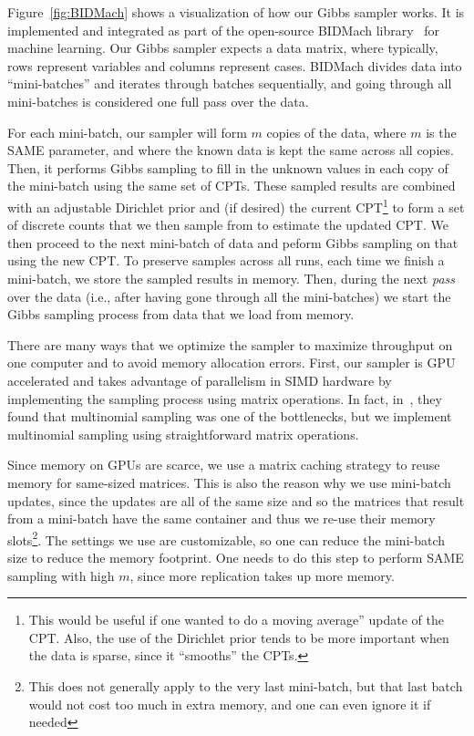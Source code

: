 \documentclass{article} %
\begin{document}
Figure~\ref{fig:BIDMach} shows a visualization of how our Gibbs sampler works. It is implemented and
integrated as part of the open-source BIDMach library~\citep{bidmach} for machine learning. Our
Gibbs sampler expects a data matrix, where typically, rows represent variables and columns represent
cases. BIDMach divides data into ``mini-batches'' and iterates through batches sequentially, and
going through all mini-batches is considered one full pass over the data.

For each mini-batch, our sampler will form $m$ copies of the data, where $m$ is the SAME parameter,
and where the known data is kept the same across all copies. Then, it performs Gibbs sampling to
fill in the unknown values in each copy of the mini-batch using the same set of CPTs.  These sampled
results are combined with an adjustable Dirichlet prior and (if desired) the current
CPT\footnote{This would be useful if one wanted to do a moving average'' update of the CPT. Also,
the use of the Dirichlet prior tends to be more important when the data is sparse, since it
``smooths'' the CPTs.} to form a set of discrete counts that we then sample from to estimate the
updated CPT. We then proceed to the next mini-batch of data and peform Gibbs sampling on that using
the new CPT. To preserve samples across all runs, each time we finish a mini-batch, we store the
sampled results in memory. Then, during the next \emph{pass} over the data (i.e., after having gone
through all the mini-batches) we start the Gibbs sampling process from data that we load from
memory.

There are many ways that we optimize the sampler to maximize throughput on one computer and to avoid
memory allocation errors. First, our sampler is GPU accelerated and takes advantage of parallelism
in SIMD hardware by implementing the sampling process using matrix operations. In fact,
in~\citep{SAME2015}, they found that multinomial sampling was one of the bottlenecks, but we
implement multinomial sampling using straightforward matrix operations.

Since memory on GPUs are scarce, we use a matrix caching strategy to reuse memory for same-sized
matrices. This is also the reason why we use mini-batch updates, since the updates are all of the
same size and so the matrices that result from a mini-batch have the same container and thus we
re-use their memory slots\footnote{This does not generally apply to the very last mini-batch, but
that last batch would not cost too much in extra memory, and one can even ignore it if needed}. The
settings we use are customizable, so one can reduce the mini-batch size to reduce the memory
footprint. One needs to do this step to perform SAME sampling with high $m$, since more replication
takes up more memory.
\end{document}
